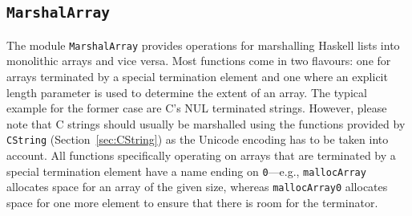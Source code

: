 \documentclass[a4paper,twosides]{article}
\newcommand{\code}[1]{\texttt{#1}}      %
\begin{document}
\subsection{\code{MarshalArray}}
\label{sec:MarshalArray}

The module \code{MarshalArray} provides operations for marshalling Haskell
lists into monolithic arrays and vice versa.  Most functions come in two
flavours: one for arrays terminated by a special termination element and one
where an explicit length parameter is used to determine the extent of an
array.  The typical example for the former case are C's NUL terminated
strings.  However, please note that C strings should usually be marshalled
using the functions provided by \code{CString} (Section~\ref{sec:CString}) as
the Unicode encoding has to be taken into account.  All functions specifically
operating on arrays that are terminated by a special termination element have
a name ending on \code{0}---e.g., \code{mallocArray} allocates space for an
array of the given size, whereas \code{mallocArray0} allocates space for one
more element to ensure that there is room for the terminator.
\end{document}
